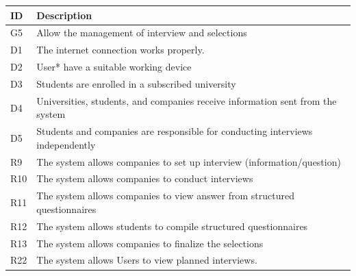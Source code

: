 \begin{center}
    \begin{longtable}{|l|p{13.5cm}|}
        \hline
        \rowcolor[HTML]{5C8A99}
        \textbf{ID} & \textbf{Description} \\ \hline
        \rowcolor[HTML]{E7E0FA} %
        G5 & Allow the management of interview and selections \\ \hline
        \rowcolor[HTML]{FFF9C4} %
        D1 & The internet connection works properly. \\ \hline
        \rowcolor[HTML]{FFF9C4} %
        D2 & User* have a suitable working device \\ \hline
        \rowcolor[HTML]{FFF9C4} %
        D3 & Students are enrolled in a subscribed university \\ \hline
        \rowcolor[HTML]{FFF9C4} %
        D4 & Universities, students, and companies receive information sent from the system \\ \hline
        \rowcolor[HTML]{FFF9C4} %
        D5 & Students and companies are responsible for conducting interviews independently \\ \hline
        \hline\rowcolor[HTML]{FFDAB9} %
        R9 & The system allows companies to set up interview (information/question) \\ \hline
        \hline\rowcolor[HTML]{FFDAB9} %
        R10 & The system allows companies to conduct interviews \\ \hline
        \hline\rowcolor[HTML]{FFDAB9} %
        R11 & The system allows companies to view answer from structured questionnaires \\ \hline
        \hline\rowcolor[HTML]{FFDAB9} %
        R12 & The system allows students to compile structured questionnaires \\ \hline
        \hline\rowcolor[HTML]{FFDAB9} %
        R13 &The system allows companies to finalize the selections \\ \hline
        \hline\rowcolor[HTML]{FFDAB9} %
        R22 & The system allows Users to view planned interviews. \\ \hline
    \end{longtable}
\end{center}

